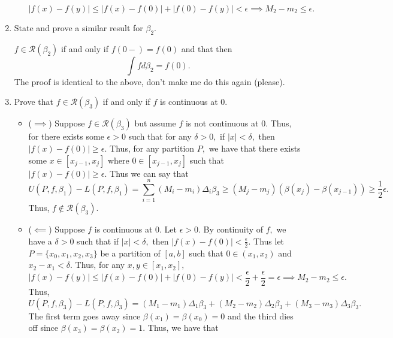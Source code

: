 \documentclass[11pt]{article}
\begin{document}
\begin{enumerate}
\begin{solution}
\begin{itemize}
            \[|f(x) - f(y)|\leq |f(x) - f(0)| + |f(0) - f(y)|< \epsilon \implies M_2 - m_2 \leq \epsilon.\]
        \end{itemize}
    \end{solution}
    \item 
    \begin{problem}
        State and prove a similar result for $\beta_2.$
    \end{problem}
    \begin{solution}
        $f \in \mathcal{R}(\beta_2)$ if and only if $f(0-) = f(0)$ and that then 
        \[\int f d\beta_2 = f(0).\] The proof is identical to the above, don't make me do this again (please).
    \end{solution}
    \item 
    \begin{problem}
            Prove that $f\in \mathcal{R}(\beta_3)$ if and only if $f$ is continuous at $0.$
    \end{problem}
    \begin{solution}
        \begin{itemize}
            \item ($\implies$) Suppose $f\in \mathcal{R}(\beta_3)$ but assume $f$ is not continuous at $0.$ Thus, for there exists some $\epsilon>0$ such that for any $\delta>0,$ if $|x|< \delta,$ then $|f(x) - f(0)| \geq \epsilon.$ Thus, for any partition $P,$ we have that there exists some $x \in [x_{j-1}, x_j]$ where $0 \in [x_{j-1}, x_j]$ such that $|f(x) - f(0)|\geq \epsilon.$ Thus we can say that 
            \[U(P, f, \beta_1) - L(P, f, \beta_1) = \sum_{i=1}^n (M_i - m_i)\Delta_i \beta_3 \geq (M_j - m_j)(\beta(x_j) - \beta(x_{j-1}))\geq \frac{1}{2}\epsilon.\] Thus, $f\notin \mathcal{R}(\beta_3).$
            \item ($\impliedby$) Suppose $f$ is continuous at $0.$ Let $\epsilon>0.$ By continuity of $f,$ we have a $\delta>0$ such that if $|x|< \delta,$ then $|f(x) - f(0)|< \frac{\epsilon}{2}.$ Thus let $P = \{x_0, x_1, x_2, x_3\}$ be a partition of $[a,b]$ such that $0 \in (x_1, x_2)$ and $x_2 - x_1< \delta.$ Thus, for any $x,y \in [x_1, x_2],$ \[|f(x) - f(y)| \leq |f(x) - f(0)| + |f(0) - f(y)| < \frac{\epsilon}{2} + \frac{\epsilon}{2}  = \epsilon \implies M_2 - m_2 \leq \epsilon.\] Thus, 
            \[U(P,f,\beta_3) - L(P, f, \beta_3) = (M_1 - m_1)\Delta_1\beta_3 + (M_2 - m_2)\Delta_2 \beta_3 + (M_3 - m_3)\Delta_3 \beta_3.\] The first term goes away since $\beta(x_1) = \beta(x_0) = 0$ and the third dies off since $\beta(x_3) = \beta(x_2) = 1.$ Thus, we have that 

\end{itemize}
\end{solution}
\end{enumerate}
\end{document}
